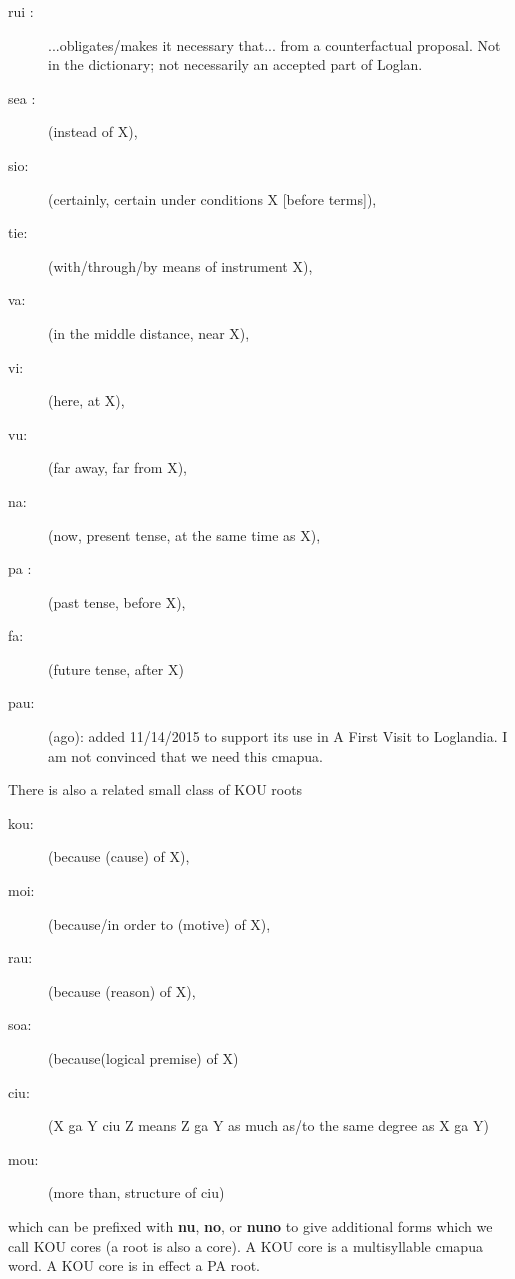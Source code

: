 \documentclass[12pt]{book}
\begin{document}
\begin{description}
\item[rui :] ...obligates/makes it necessary that... from a counterfactual proposal.  Not in the dictionary; not necessarily an accepted part of Loglan.

\item[sea :] (instead of X), 

\item[sio:]  (certainly, certain under conditions X [before terms]), 

\item[tie:]  (with/through/by means of instrument X), 

\item[va:]  (in the middle distance, near X), 

\item[vi:]  (here, at X), 

\item[vu:]  (far away, far from X), 

\item[na:]  (now, present tense, at the same time as X), 

\item[pa  :] (past tense, before X), 

\item[fa:]  (future tense, after X)

\item[pau:]  (ago):  added 11/14/2015 to support its use in A First Visit to Loglandia.  I am not convinced that we need this cmapua.


\end{description}

There is also a  related small class of KOU roots 

\begin{description}
\item[kou:] (because (cause)  of X), 
\item[moi:] (because/in order to (motive) of X), 
\item[rau:] (because (reason)  of X), 
\item[soa:] (because(logical premise) of X)

\item[ciu:]  (X ga Y ciu Z means Z ga Y as much as/to the same degree as X ga Y)
\item[mou:]  (more than, structure of ciu)
\end{description}

 which can be prefixed with {\bf nu}, {\bf no}, or {\bf nuno} to give additional forms which we call KOU cores (a root is also a core).   A KOU core is a multisyllable cmapua word.  A KOU core is in effect a PA root.
\end{document}
